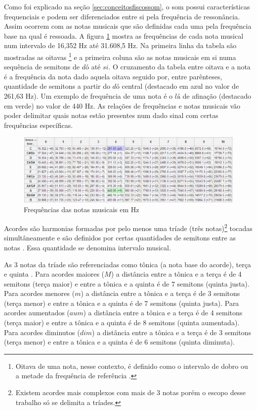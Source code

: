 Como foi explicado na seção \ref{sec:conceitosfiscossom}, o som possui características frequenciais e podem ser diferenciados entre si pela frequência de ressonância. Assim ocorrem com as notas musicais que são definidas cada uma pela frequência base na qual é ressoada. A figura \ref{fig:notasfreq} mostra as frequências de cada nota musical num intervalo de 16,352 Hz até 31.608,5 Hz. Na primeira linha da tabela são mostradas as oitavas \footnote{Oitava de uma nota, nesse contexto, é definido como o intervalo de dobro ou a metade da frequência de referência \cite{med1996teoria}.} e a primeira coluna são as notas musicais em si numa sequência de semitons de $dó$ até $si$. O cruzamento da tabela entre oitava e a nota é a frequência da nota dado aquela oitava seguido por, entre parênteses, quantidade de semitons a partir do $dó$ central (destacado em azul no valor de 261,63 Hz). Um exemplo de frequência de uma nota é o $lá$ de afinação (destacado em verde) no valor de 440 Hz. As relações de frequências e notas musicais vão poder delimitar quais notas estão presentes num dado sinal com certas frequências específicas.

\begin{figure}[h]
	\centering
		\includegraphics[scale=0.6]{figuras/NOTASpt.eps}
	\caption{Frequências das notas musicais em Hz \cite{notasfreq}}
	\label{fig:notasfreq}
\end{figure}

Acordes são harmonias formadas por pelo menos uma tríade (três notas)\footnote{Existem acordes mais complexos com mais de 3 notas porém o escopo desse trabalho só se delimita a tríades.} tocadas simultâneamente e são definidos por certas quantidades de semitons entre as notas \cite{med1996teoria}. Essa quantidade se denomina intervalo musical.

As 3 notas da tríade são referenciadas como tônica (a nota base do acorde), terça e quinta \cite{med1996teoria}. Para acordes maiores ($M$) a distância entre a tônica e a terça é de 4 semitons (terça maior) e entre a tônica e a quinta é de 7 semitons (quinta justa). Para acordes menores ($m$) a distância entre a tônica e a terça é de 3 semitons (terça menor) e entre a tônica e a quinta é de 7 semitons (quinta justa). Para acordes aumentados ($aum$) a distância entre a tônica e a terça é de 4 semitons (terça maior) e entre a tônica e a quinta é de 8 semitons (quinta aumentada). Para acordes diminutos ($dim$) a distância entre a tônica e a terça é de 3 semitons (terça menor) e entre a tônica e a quinta é de 6 semitons (quinta diminuta).

